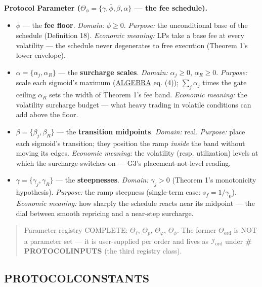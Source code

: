 \documentclass[11pt]{article}
\renewcommand{\_}{\textunderscore\allowbreak}
\begin{document}
\textbf{Protocol Parameter (\(\Theta_{\phi} = \{\gamma, \bar\phi, \beta, \alpha\}\) --- the fee schedule).}

\begin{itemize}
\item
  \(\bar\phi\) --- the \textbf{fee floor}. \emph{Domain:} \(\bar\phi \geq 0\). \emph{Purpose:} the unconditional base of the schedule (Definition 18). \emph{Economic meaning:} LPs take a base fee at every volatility --- the schedule never degenerates to free execution (Theorem 1's lower envelope).
\item
  \(\alpha = \{\alpha_j, \alpha_R\}\) --- the \textbf{surcharge scales}. \emph{Domain:} \(\alpha_j \geq 0\), \(\alpha_R \geq 0\). \emph{Purpose:} scale each sigmoid's maximum (\href{../refs/algebra-tech-paper.pdf}{ALGEBRA} eq. (4)); \(\sum_j \alpha_j\) times the gate ceiling \(\alpha_R\) sets the width of Theorem 1's fee band. \emph{Economic meaning:} the volatility surcharge budget --- what heavy trading in volatile conditions can add above the floor.
\item
  \(\beta = \{\beta_j, \beta_R\}\) --- the \textbf{transition midpoints}. \emph{Domain:} real. \emph{Purpose:} place each sigmoid's transition; they position the ramp \emph{inside} the band without moving its edges. \emph{Economic meaning:} the volatility (resp. utilization) levels at which the surcharge switches on --- G3's placement-not-level reading.
\item
  \(\gamma = \{\gamma_j, \gamma_R\}\) --- the \textbf{steepnesses}. \emph{Domain:} \(\gamma_j > 0\) (Theorem 1's monotonicity hypothesis). \emph{Purpose:} the ramp steepness (single-term case: \(s_f = 1/\gamma_0\)). \emph{Economic meaning:} how sharply the schedule reacts near its midpoint --- the dial between smooth repricing and a near-step surcharge.
\end{itemize}

\begin{quote}
Parameter registry COMPLETE: \(\Theta_{\ell}\), \(\Theta_{p}\), \(\Theta_{\varphi}\), \(\Theta_{\phi}\). The former \(\Theta_{\text{ord}}\) is NOT a parameter set --- it is user-supplied per order and lives as \(\mathcal{I}_{\text{ord}}\) under \textbf{\# PROTOCOL\_INPUTS} (the third registry class).
\end{quote}

\subsection*{PROTOCOL\_CONSTANTS}\label{protocol_constants}
\end{document}
